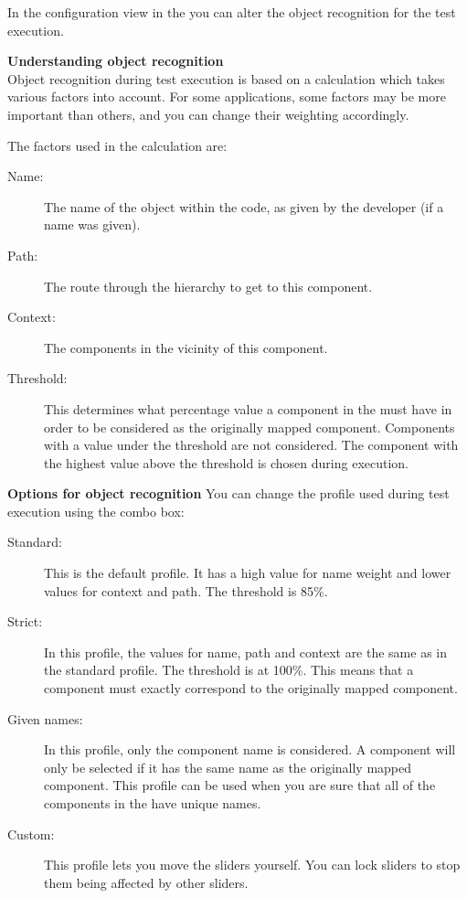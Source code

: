 \label{TasksOMConfiguration}

In the configuration view in the \gdomeditor{} you can alter the object recognition for the test execution. 


\textbf{Understanding object recognition}\\
Object recognition during test execution is based on a calculation which takes various factors into account. For some applications, some factors may be more important than others, and you can change their weighting accordingly. 

The factors used in the calculation are:

\begin{description}
\item [Name:]{The name of the object within the \gdaut{} code, as given by the developer (if a name was given). }
\item [Path:]{The route through the \gdaut{} hierarchy to get to this component.}
\item [Context:]{The components in the vicinity of this component.}
\item[Threshold:]{This determines what percentage value a component in the \gdaut{} must have in order to be considered as the originally mapped component. Components with a value under the threshold are not considered. The component with the highest value above the threshold is chosen during execution.}
\end{description}

\textbf{Options for object recognition}
You can change the profile used during test execution using the combo box:

\begin{description}
\item[Standard:]{This is the default profile. It has a high value for name weight and lower values for context and path. The threshold is 85\%.}
\item[Strict:]{In this profile, the values for name, path and context are the same as in the standard profile. The threshold is at 100\%. This means that a component must exactly correspond to the originally mapped component.}
\item[Given names:]{In this profile, only the component name is considered. A component will only be selected if it has the same name as the originally mapped component. This profile can be used when you are sure that all of the components in the \gdaut{} have unique names.}
\item[Custom:]{This profile lets you move the sliders yourself. You can lock sliders to stop them being affected by other sliders.}
\end{description}

